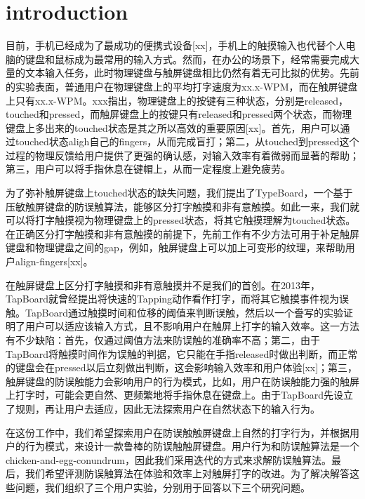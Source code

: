 \section{introduction}

目前，手机已经成为了最成功的便携式设备[xx]，手机上的触摸输入也代替个人电脑的键盘和鼠标成为最常用的输入方式。然而，在办公的场景下，经常需要完成大量的文本输入任务，此时物理键盘与触屏键盘相比仍然有着无可比拟的优势。先前的实验表面，普通用户在物理键盘上的平均打字速度为xx.x-WPM，而在触屏键盘上只有xx.x-WPM。xxx指出，物理键盘上的按键有三种状态，分别是released，touched和pressed，而触屏键盘上的按键只有released和pressed两个状态，而物理键盘上多出来的touched状态是其之所以高效的重要原因[xx]。首先，用户可以通过touched状态aligh自己的fingers，从而完成盲打；第二，从touched到pressed这个过程的物理反馈给用户提供了更强的确认感，对输入效率有着微弱而显著的帮助；第三，用户可以将手指休息在键帽上，从而一定程度上避免疲劳。

为了弥补触屏键盘上touched状态的缺失问题，我们提出了TypeBoard，一个基于压敏触屏键盘的防误触算法，能够区分打字触摸和非有意触摸。如此一来，我们就可以将打字触摸视为物理键盘上的pressed状态，将其它触摸理解为touched状态。在正确区分打字触摸和非有意触摸的前提下，先前工作有不少方法可用于补足触屏键盘和物理键盘之间的gap，例如，触屏键盘上可以加上可变形的纹理，来帮助用户align-fingers[xx]。

在触屏键盘上区分打字触摸和非有意触摸并不是我们的首创。在2013年，TapBoard就曾经提出将快速的Tapping动作看作打字，而将其它触摸事件视为误触。TapBoard通过触摸时间和位移的阈值来判断误触，然后以一个誊写的实验证明了用户可以适应该输入方式，且不影响用户在触屏上打字的输入效率。这一方法有不少缺陷：首先，仅通过阈值方法来防误触的准确率不高；第二，由于TapBoard将触摸时间作为误触的判据，它只能在手指released时做出判断，而正常的键盘会在pressed以后立刻做出判断，这会影响输入效率和用户体验[xx]；第三，触屏键盘的防误触能力会影响用户的行为模式，比如，用户在防误触能力强的触屏上打字时，可能会更自然、更频繁地将手指休息在键盘上。由于TapBoard先设立了规则，再让用户去适应，因此无法探索用户在自然状态下的输入行为。

在这份工作中，我们希望探索用户在防误触触屏键盘上自然的打字行为，并根据用户的行为模式，来设计一款鲁棒的防误触触屏键盘。用户行为和防误触算法是一个chicken-and-egg-conundrum，因此我们采用迭代的方式来求解防误触算法。最后，我们希望评测防误触算法在体验和效率上对触屏打字的改进。为了解决解答这些问题，我们组织了三个用户实验，分别用于回答以下三个研究问题。


